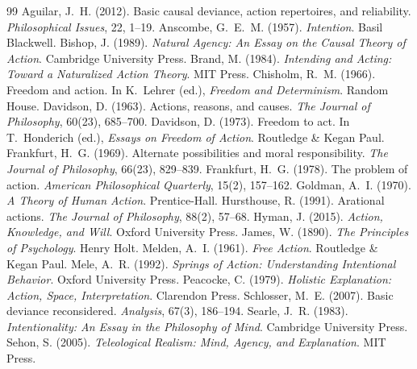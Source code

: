 \documentclass{situationist-preprint}
\begin{document}
\begin{thebibliography}{99}\small
{} Aguilar, J.~H. (2012). Basic causal deviance, action repertoires, and reliability. \emph{Philosophical Issues}, 22, 1--19.
 Anscombe, G.~E.~M. (1957). \emph{Intention}. Basil Blackwell.
 Bishop, J. (1989). \emph{Natural Agency: An Essay on the Causal Theory of Action}. Cambridge University Press.
 Brand, M. (1984). \emph{Intending and Acting: Toward a Naturalized Action Theory}. MIT Press.
 Chisholm, R.~M. (1966). Freedom and action. In K.~Lehrer (ed.), \emph{Freedom and Determinism}. Random House.
 Davidson, D. (1963). Actions, reasons, and causes. \emph{The Journal of Philosophy}, 60(23), 685--700.
 Davidson, D. (1973). Freedom to act. In T.~Honderich (ed.), \emph{Essays on Freedom of Action}. Routledge \& Kegan Paul.
 Frankfurt, H.~G. (1969). Alternate possibilities and moral responsibility. \emph{The Journal of Philosophy}, 66(23), 829--839.
 Frankfurt, H.~G. (1978). The problem of action. \emph{American Philosophical Quarterly}, 15(2), 157--162.
 Goldman, A.~I. (1970). \emph{A Theory of Human Action}. Prentice-Hall.
 Hursthouse, R. (1991). Arational actions. \emph{The Journal of Philosophy}, 88(2), 57--68.
 Hyman, J. (2015). \emph{Action, Knowledge, and Will}. Oxford University Press.
 James, W. (1890). \emph{The Principles of Psychology}. Henry Holt.
 Melden, A.~I. (1961). \emph{Free Action}. Routledge \& Kegan Paul.
 Mele, A.~R. (1992). \emph{Springs of Action: Understanding Intentional Behavior}. Oxford University Press.
 Peacocke, C. (1979). \emph{Holistic Explanation: Action, Space, Interpretation}. Clarendon Press.
 Schlosser, M.~E. (2007). Basic deviance reconsidered. \emph{Analysis}, 67(3), 186--194.
 Searle, J.~R. (1983). \emph{Intentionality: An Essay in the Philosophy of Mind}. Cambridge University Press.
 Sehon, S. (2005). \emph{Teleological Realism: Mind, Agency, and Explanation}. MIT Press.

\end{thebibliography}
\end{document}
